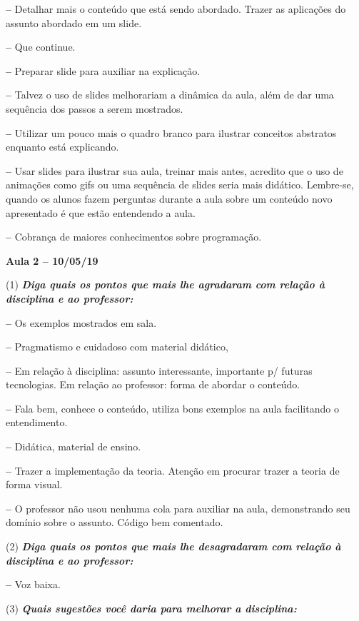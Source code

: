 \documentclass[
	12pt,				%
	openright,			%
	oneside,			%
	a4paper,			%
	chapter=TITLE,		%
	section=TITLE,		%
	english,			%
	french,				%
	spanish,			%
	brazil				%
	]{abntex2}
\begin{document}
\textbf{--} Detalhar mais o conteúdo que está sendo abordado. Trazer as aplicações do assunto abordado em um slide.

\textbf{--} Que continue.

\textbf{--} Preparar slide para auxiliar na explicação.

\textbf{--} Talvez o uso de slides melhorariam a dinâmica da aula, além de dar uma sequência dos passos a serem mostrados.

\textbf{--} Utilizar um pouco mais o quadro branco para ilustrar conceitos abstratos enquanto está explicando.

\textbf{--} Usar slides para ilustrar sua aula, treinar mais antes, acredito que o uso de animações como gifs ou uma sequência de slides seria mais didático. Lembre-se, quando os alunos fazem perguntas durante a aula sobre um conteúdo novo apresentado é que estão entendendo a aula.

\textbf{--} Cobrança de maiores conhecimentos sobre programação.


\vspace{1cm}

\textbf{Aula 2 -- 10/05/19}

(1) \textit{\textbf{Diga quais os pontos que mais lhe agradaram com relação à disciplina e ao professor:}}

\textbf{--} Os exemplos mostrados em sala.

\textbf{--} Pragmatismo e cuidadoso com material didático,

\textbf{--} Em relação à disciplina: assunto interessante, importante p/ futuras tecnologias. Em relação ao professor: forma de abordar o conteúdo.

\textbf{--} Fala bem, conhece o conteúdo, utiliza bons exemplos na aula facilitando o entendimento.

\textbf{--} Didática, material de ensino.

\textbf{--} Trazer a implementação da teoria. Atenção em procurar trazer a teoria de forma visual.

\textbf{--} O professor não usou nenhuma cola para auxiliar na aula, demonstrando seu domínio sobre o assunto. Código bem comentado.

(2) \textit{\textbf{Diga quais os pontos que mais lhe desagradaram com relação à disciplina e ao professor:}}

\textbf{--} Voz baixa.

(3) \textit{\textbf{Quais sugestões você daria para melhorar a disciplina:}}
\end{document}
